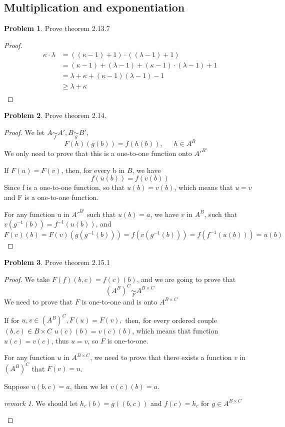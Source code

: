 \documentclass[a4paper,11pt]{article}%
\theoremstyle{remark}
\newtheorem*{remark}{remark}
\theoremstyle{definition}
\newtheorem{problem}{Problem}[subsection]
\begin{document}
\subsection{Multiplication and exponentiation}
\begin{problem}
    Prove theorem 2.13.7
    \begin{proof}
        \[\begin{array}{rl}
            \kappa\cdot\lambda&=((\kappa-1)+1)\cdot((\lambda-1)+1)\\
                              &=(\kappa-1)+(\lambda-1)+(\kappa-1)\cdot(\lambda-1)+1\\
                              &=\lambda+\kappa+(\kappa-1)(\lambda-1)-1\\
                              &\geq \lambda+\kappa\\
        \end{array}\]
    \end{proof}
\end{problem}
\begin{problem}
    Prove theorem 2.14.
    \begin{proof}
        We let $A\underset{f}{\sim}A',B\underset{g}{\sim}B'$,
        \[F(h)(g(b))=f(h(b)),\phantom{111}h\in A^B\]
        We only need to prove that this is a one-to-one function onto $A'^{B'}$

        If $F(u)=F(v)$, then, for every b in $B$, we have
        \[f(u(b))=f(v(b))\]
        Since f is a one-to-one function, so that $u(b)=v(b)$,
        which means that $u=v$ and F is a one-to-one function.
        
        For any function u in $A'^{B'}$ such that $u(b)=a$, we have $v$ in $A^B$,
        such that $v(g^{-1}(b))=f^{-1}(u(b))$, and \[F(v)(b)=F(v)(g(g^{-1}(b)))=f(v(g^{-1}(b)))=f(f^{-1}(u(b)))=u(b)\]
    \end{proof}
\end{problem}
\begin{problem}
   Prove  theorem 2.15.1
   \begin{proof}
    We take $F(f)(b,c)=f(c)(b)$, and we are going to prove that 
    \[(A^B)^C\underset{F}{\sim}A^{B\times C}\]
    We need to prove that $F$ is one-to-one and is onto $A^{B\times C}$

    If for $u,v\in (A^B)^C, F(u)=F(v),$ then, for every ordered couple $(b,c) \in B\times C$
    $u(c)(b)=v(c)(b)$, which means that function $u(c)=v(c)$, thus $u=v$, so $F$ is one-to-one.

    For any function $u$ in $A^{B\times C}$, we need to prove that there exists a
    function $v$ in $(A^B)^C$ that $F(v)=u$.

    Suppose $u(b,c)=a$, then we let $v(c)(b)=a$.
\begin{remark}
    We should let $h_c(b)=g((b,c))$ and $f(c)=h_c$ for $g\in A^{B\times C}$
\end{remark}
   \end{proof}
\end{problem}
\end{document}
